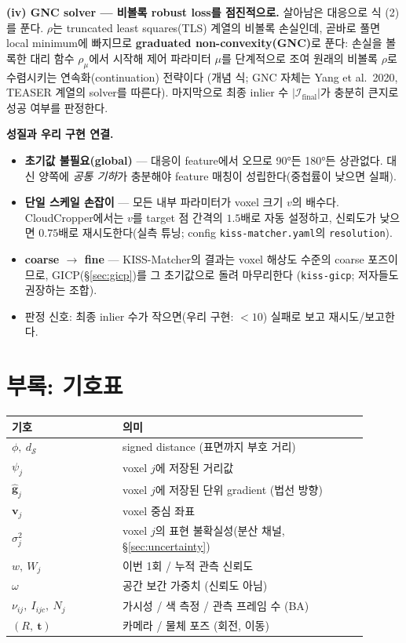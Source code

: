 \textbf{(iv) GNC solver --- 비볼록 robust loss를 점진적으로.} 살아남은
대응으로 식 (2)를 푼다. $\rho$는 truncated least squares(TLS) 계열의
비볼록 손실인데, 곧바로 풀면 local minimum에 빠지므로 \textbf{graduated
non-convexity(GNC)}로 푼다: 손실을 볼록한 대리 함수
$\rho_{\mu}$에서 시작해 제어 파라미터 $\mu$를 단계적으로 조여
원래의 비볼록 $\rho$로 수렴시키는 연속화(continuation) 전략이다 (개념 식;
GNC 자체는 Yang et al.\ 2020, TEASER 계열의 solver를 따른다). 마지막으로
최종 inlier 수 $\lvert\mathcal{I}_{\text{final}}\rvert$가 충분히 큰지로
성공 여부를 판정한다.

\textbf{성질과 우리 구현 연결.}
\begin{itemize}
  \item \textbf{초기값 불필요(global)} --- 대응이 feature에서 오므로 90°든
  180°든 상관없다. 대신 양쪽에 \emph{공통 기하}가 충분해야 feature 매칭이
  성립한다(중첩률이 낮으면 실패).
  \item \textbf{단일 스케일 손잡이} --- 모든 내부 파라미터가 voxel 크기
  $v$의 배수다. CloudCropper에서는 $v$를 target 점 간격의 $1.5$배로 자동
  설정하고, 신뢰도가 낮으면 $0.75$배로 재시도한다(실측 튜닝;
  config \texttt{kiss-matcher.yaml}의 \texttt{resolution}).
  \item \textbf{coarse $\to$ fine} --- KISS-Matcher의 결과는 voxel 해상도
  수준의 coarse 포즈이므로, GICP(\S\ref{sec:gicp})를 그 초기값으로 돌려
  마무리한다 (\texttt{kiss-gicp}; 저자들도 권장하는 조합).
  \item 판정 신호: 최종 inlier 수가 작으면(우리 구현: $<10$) 실패로 보고
  재시도/보고한다.
\end{itemize}

\section*{부록: 기호표}

\begin{longtable}{p{0.28\linewidth}p{0.62\linewidth}}
\toprule
\textbf{기호} & \textbf{의미} \\
\midrule
$\phi,\ d_{\mathcal{S}}$ & signed distance (표면까지 부호 거리) \\
$\psi_j$ & voxel $j$에 저장된 거리값 \\
$\hat{\mathbf{g}}_j$ & voxel $j$에 저장된 단위 gradient (법선 방향) \\
$\mathbf{v}_j$ & voxel 중심 좌표 \\
$\sigma_j^2$ & voxel $j$의 표현 불확실성(분산 채널, \S\ref{sec:uncertainty}) \\
$w,\ W_j$ & 이번 1회 / 누적 관측 신뢰도 \\
$\omega$ & 공간 보간 가중치 (신뢰도 아님) \\
$\nu_{ij},\ I_{ijc},\ N_j$ & 가시성 / 색 측정 / 관측 프레임 수 (BA) \\
$(R,\ \mathbf{t})$ & 카메라 / 물체 포즈 (회전, 이동) \\
\bottomrule
\end{longtable}
